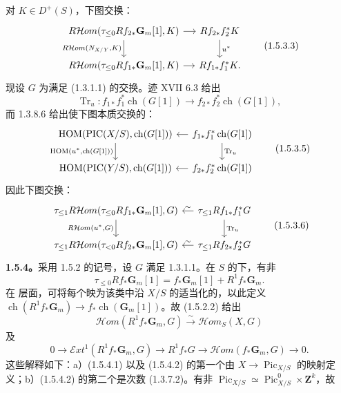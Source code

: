 对 $K\in D^+(S)$，下图交换：
\[\begin{tikzcd}[column sep=small]R\mathcal Hom(\tau_{\le0}Rf_{2*}\mathbf G_m[1],K)\arrow[r]\arrow[d,"{R\mathcal Hom(N_{X/Y},K)}"']&Rf_{2*}f_2^*K\arrow[d,"u^*"]\\R\mathcal Hom(\tau_{\le0}Rf_{1*}\mathbf G_m[1],K)\arrow[r]&Rf_{1*}f_1^*K.\end{tikzcd}\tag{1.5.3.3}\]
现设 $G$ 为满足 (1.3.1.1) 的交换。迹 XVII 6.3 给出
\[\operatorname{Tr}_u:f_{1*}f_1^*\operatorname{ch}(G[1])\to f_{2*}f_2^*\operatorname{ch}(G[1]),\tag{1.5.3.4}\]
而 1.3.8.6 给出使下图本质交换的：
\[\begin{tikzcd}[column sep=small]
\operatorname{HOM}(\operatorname{PIC}(X/S),\operatorname{ch}(G[1]))\arrow[d,"{\operatorname{HOM}(u^*,\operatorname{ch}(G[1]))}"']&f_{1*}f_1^*\operatorname{ch}(G[1])\arrow[l]\arrow[d,"\operatorname{Tr}_u"]\\
\operatorname{HOM}(\operatorname{PIC}(Y/S),\operatorname{ch}(G[1]))&f_{2*}f_2^*\operatorname{ch}(G[1])\arrow[l]
\end{tikzcd}\tag{1.5.3.5}\]
因此下图交换：
\[\begin{tikzcd}[column sep=small]
\tau_{\le1}R\mathcal Hom(\tau_{\le0}Rf_{1*}\mathbf G_m[1],G)\arrow[d,"{R\mathcal Hom(u^*,G)}"']&\tau_{\le1}Rf_{1*}f_1^*G\arrow[l,"\sim"']\arrow[d,"\operatorname{Tr}_u"]\\
\tau_{\le1}R\mathcal Hom(\tau_{<0}Rf_{2*}\mathbf G_m[1],G)&\tau_{\le1}Rf_{2*}f_2^*G\arrow[l,"\sim"']
\end{tikzcd}\tag{1.5.3.6}\]
\textbf{1.5.4。}采用 1.5.2 的记号，设 $G$ 满足 1.3.1.1。在 $S$ 的下，有非
\[\tau_{\le0}Rf_*\mathbf G_m[1]=f_*\mathbf G_m[1]+R^1f_*\mathbf G_m.\]
在 层面，可将每个映为该类中沿 $X/S$ 的适当化的，以此定义 $\operatorname{ch}(R^1f_*\mathbf G_m)\to f_*\operatorname{ch}(\mathbf G_m[1])$。故 (1.5.2.2) 给出
\[\mathcal Hom(R^1f_*\mathbf G_m,G)\xrightarrow\sim\mathcal Hom_S(X,G)\tag{1.5.4.1}\]
及
\[0\to\mathcal Ext^1(R^1f_*\mathbf G_m,G)\to R^1f_*G\to\mathcal Hom(f_*\mathbf G_m,G)\to0.\tag{1.5.4.2}\]
这些解释如下：a）(1.5.4.1) 以及 (1.5.4.2) 的第一个由 $X\to\operatorname{Pic}_{X/S}$ 的映射定义；b）(1.5.4.2) 的第二个是次数 (1.3.7.2)。有非 $\operatorname{Pic}_{X/S}\simeq\operatorname{Pic}^0_{X/S}\times\mathbf Z^k$，故
